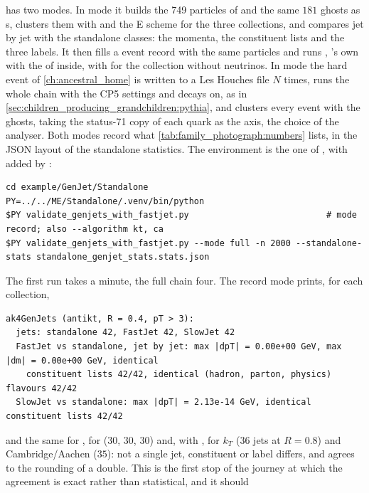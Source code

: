  has two modes. In mode
 it builds the 749 particles of  and
the same $181$ ghosts as \FASTJET {}s, clusters them with
 and the E scheme for the three
collections, and compares jet by jet with the standalone classes: the
momenta, the constituent lists and the three labels. It then fills a
\PYTHIA event record with the same particles and runs ,
\PYTHIA's own \antikt with the  of \FASTJET inside, with
 for the collection without neutrinos. In mode
 the hard event of \cref{ch:ancestral_home} is written to a
Les Houches file $N$ times, \PYTHIA runs the whole chain with the CP5
settings and decays on, as in
\cref{sec:children_producing_grandchildren:pythia}, and \FASTJET clusters
every event with the ghosts, taking the status-71 copy of each quark as
the axis, the choice of the \CMSSW analyser. Both modes record what
\cref{tab:family_photograph:numbers} lists, in the JSON layout of the
standalone statistics. The environment is the one of
, with \FASTJET added by :
\begin{verbatim}
cd example/GenJet/Standalone
PY=../../ME/Standalone/.venv/bin/python
$PY validate_genjets_with_fastjet.py                           # mode record; also --algorithm kt, ca
$PY validate_genjets_with_fastjet.py --mode full -n 2000 --standalone-stats standalone_genjet_stats.stats.json
\end{verbatim}
The first run takes a minute, the full chain four. The record mode
prints, for each collection,
\begin{verbatim}
ak4GenJets (antikt, R = 0.4, pT > 3):
  jets: standalone 42, FastJet 42, SlowJet 42
  FastJet vs standalone, jet by jet: max |dpT| = 0.00e+00 GeV, max |dm| = 0.00e+00 GeV, identical
    constituent lists 42/42, identical (hadron, parton, physics) flavours 42/42
  SlowJet vs standalone: max |dpT| = 2.13e-14 GeV, identical constituent lists 42/42
\end{verbatim}
and the same for \akfournonu, for \akeight ($30$, $30$, $30$) and, with
, for $k_T$ ($36$ jets at $R=0.8$) and Cambridge/Aachen
($35$): not a single jet, constituent or label differs, and 
agrees to the rounding of a double. This is the first stop of the journey
at which the agreement is exact rather than statistical, and it should
